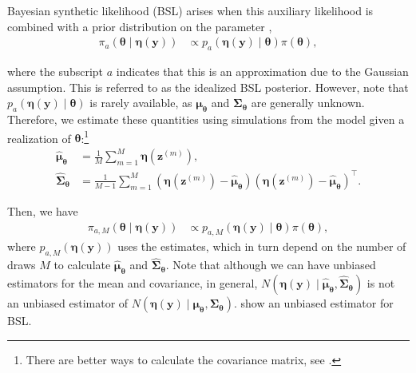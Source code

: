 Bayesian synthetic likelihood (BSL) arises when this auxiliary likelihood is combined with a prior distribution on the parameter \cite{drovandi2015bayesian,price2018bayesian},
\begin{align*} 
	\pi_{a}(\boldsymbol{\theta} \mid \boldsymbol{\eta}(\boldsymbol{y})) &\propto p_{a}(\boldsymbol{\eta}(\boldsymbol{y})\mid \boldsymbol{\theta}) \pi(\boldsymbol{\theta}), 
\end{align*}

where the subscript \( a \) indicates that this is an approximation due to the Gaussian assumption. This is referred to as the idealized BSL posterior. However, note that \( p_a(\boldsymbol{\eta}(\boldsymbol{y})\mid \boldsymbol{\theta}) \) is rarely available, as \( \boldsymbol{\mu}_{\boldsymbol{\theta}} \) and \( \boldsymbol{\Sigma}_{\boldsymbol{\theta}} \) are generally unknown. Therefore, we estimate these quantities using simulations from the model given a realization of $\boldsymbol{\theta}$:\footnote{There are better ways to calculate the covariance matrix, see \cite{nott2023bayesian}.}
\begin{align*} 
	\widehat{\boldsymbol{\mu}}_{\boldsymbol{\theta}} &= \frac{1}{M} \sum_{m=1}^{M} \boldsymbol{\eta}(\boldsymbol{z}^{(m)}),\\
	\widehat{\boldsymbol{\Sigma}}_{\boldsymbol{\theta}} &= \frac{1}{M-1} \sum_{m=1}^{M} (\boldsymbol{\eta}(\boldsymbol{z}^{(m)}) - \widehat{\boldsymbol{\mu}}_{\boldsymbol{\theta}})(\boldsymbol{\eta}(\boldsymbol{z}^{(m)}) - \widehat{\boldsymbol{\mu}}_{\boldsymbol{\theta}})^{\top}. 
\end{align*}

Then, we have 
\begin{align*} 
	\pi_{a,M}(\boldsymbol{\theta} \mid \boldsymbol{\eta}(\boldsymbol{y})) &\propto p_{a,M}(\boldsymbol{\eta}(\boldsymbol{y})\mid \boldsymbol{\theta}) \pi(\boldsymbol{\theta}), 
\end{align*}
where $p_{a,M}(\boldsymbol{\eta}(\boldsymbol{y}))$ uses the estimates, which in turn depend on the number of draws $M$ to calculate $\widehat{\boldsymbol{\mu}}_{\boldsymbol{\theta}}$ and $\widehat{\boldsymbol{\Sigma}}_{\boldsymbol{\theta}}$. Note that although we can have unbiased estimators for the mean and covariance, in general, $N(\boldsymbol{\eta}(\boldsymbol{y})\mid \widehat{\boldsymbol{\mu}}_{\boldsymbol{\theta}},\widehat{\boldsymbol{\Sigma}}_{\boldsymbol{\theta}})$ is not an unbiased estimator of $N(\boldsymbol{\eta}(\boldsymbol{y})\mid {\boldsymbol{\mu}}_{\boldsymbol{\theta}},{\boldsymbol{\Sigma}}_{\boldsymbol{\theta}})$. \cite{an2022bsl} show an unbiased estimator for BSL. 

